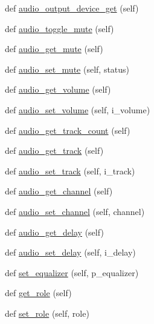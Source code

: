 \begin{DoxyCompactItemize}
\item 
def \hyperlink{classvlc_1_1_media_player_a8b9d8ed2e22b0f297547d50c9a484270}{audio\+\_\+output\+\_\+device\+\_\+get} (self)
\item 
def \hyperlink{classvlc_1_1_media_player_abecba50fe9816ec62aeacbcfa8be3c79}{audio\+\_\+toggle\+\_\+mute} (self)
\item 
def \hyperlink{classvlc_1_1_media_player_a9baa0970647aed79716319f4f956013d}{audio\+\_\+get\+\_\+mute} (self)
\item 
def \hyperlink{classvlc_1_1_media_player_a0eb67e5d4feba97af9ed0e7b2514a9a2}{audio\+\_\+set\+\_\+mute} (self, status)
\item 
def \hyperlink{classvlc_1_1_media_player_a445a9aa9f2b954c73c4ef24348d2e86b}{audio\+\_\+get\+\_\+volume} (self)
\item 
def \hyperlink{classvlc_1_1_media_player_ab4c2d886df0b4e9883063292807d293f}{audio\+\_\+set\+\_\+volume} (self, i\+\_\+volume)
\item 
def \hyperlink{classvlc_1_1_media_player_a47ac925db973be3fef872b44e76f485b}{audio\+\_\+get\+\_\+track\+\_\+count} (self)
\item 
def \hyperlink{classvlc_1_1_media_player_a7b62c60ce56f76126fc65bf2c573c264}{audio\+\_\+get\+\_\+track} (self)
\item 
def \hyperlink{classvlc_1_1_media_player_a705fbd168baaefb6ee78d814090a7919}{audio\+\_\+set\+\_\+track} (self, i\+\_\+track)
\item 
def \hyperlink{classvlc_1_1_media_player_a9ba6b4faf2208b7bb1db2ad525a50ab0}{audio\+\_\+get\+\_\+channel} (self)
\item 
def \hyperlink{classvlc_1_1_media_player_ae2b42843e5513b17e8d0e601a7cfe6fb}{audio\+\_\+set\+\_\+channel} (self, channel)
\item 
def \hyperlink{classvlc_1_1_media_player_a061b1fbe2a1ed302e0bd515b864acfe9}{audio\+\_\+get\+\_\+delay} (self)
\item 
def \hyperlink{classvlc_1_1_media_player_a0f4fdb7a7b7fa38629ee2f9930ed0967}{audio\+\_\+set\+\_\+delay} (self, i\+\_\+delay)
\item 
def \hyperlink{classvlc_1_1_media_player_a161a0eb8d93f38fa2204be0c3a51bdbd}{set\+\_\+equalizer} (self, p\+\_\+equalizer)
\item 
def \hyperlink{classvlc_1_1_media_player_a6f286402bd3fdd0b7b69deeb71870300}{get\+\_\+role} (self)
\item 
def \hyperlink{classvlc_1_1_media_player_a8373b7774e0be368ecc17eaf9177df55}{set\+\_\+role} (self, role)
\end{DoxyCompactItemize}
